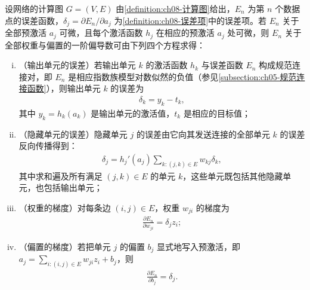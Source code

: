\documentclass[../../main.tex]{subfiles}
\begin{document}
\begin{theorem}[反向传播的四个基本方程]\label{theorem:ch08-反向传播方程}
设网络的计算图 $G=(V,E)$ 由\cref{definition:ch08-计算图}给出，$E_n$ 为第 $n$ 个数据点的误差函数，$\delta_j=\partial E_n/\partial a_j$ 为\cref{definition:ch08-误差项}中的误差项。若 $E_n$ 关于全部预激活 $a_j$ 可微，且每个激活函数 $h_j$ 在相应的预激活 $a_j$ 处可微，则 $E_n$ 关于全部权重与偏置的一阶偏导数可由下列四个方程求得：
\begin{enumerate}[(i)]
\item\label{item:ch08-输出误差}（输出单元的误差）若输出单元 $k$ 的激活函数 $h_k$ 与误差函数 $E_n$ 构成规范连接对，即 $E_n$ 是相应指数族模型对数似然的负值（参见\cref{subsection:ch05-规范连接函数}），则输出单元 $k$ 的误差为
\begin{align}
\delta_k=y_k-t_k,
\label{align:ch08-输出误差}
\end{align}
其中 $y_k=h_k(a_k)$ 是输出单元的激活值，$t_k$ 是相应的目标值；
\item\label{item:ch08-隐藏误差}（隐藏单元的误差）隐藏单元 $j$ 的误差由它向其发送连接的全部单元 $k$ 的误差反向传播得到：
\begin{align}
\delta_j=h_j'(a_j)\sum_{k:(j,k)\in E}w_{kj}\delta_k,
\label{align:ch08-隐藏误差}
\end{align}
其中求和遍及所有满足 $(j,k)\in E$ 的单元 $k$，这些单元既包括其他隐藏单元，也包括输出单元；
\item\label{item:ch08-权重梯度}（权重的梯度）对每条边 $(i,j)\in E$，权重 $w_{ji}$ 的梯度为
\begin{align}
\frac{\partial E_n}{\partial w_{ji}}=\delta_j z_i;
\label{align:ch08-权重梯度}
\end{align}
\item\label{item:ch08-偏置梯度}（偏置的梯度）若把单元 $j$ 的偏置 $b_j$ 显式地写入预激活，即 $a_j=\sum_{i:(i,j)\in E}w_{ji}z_i+b_j$，则
\begin{align}
\frac{\partial E_n}{\partial b_j}=\delta_j.
\label{align:ch08-偏置梯度}
\end{align}
\end{enumerate}
\end{theorem}
\end{document}
